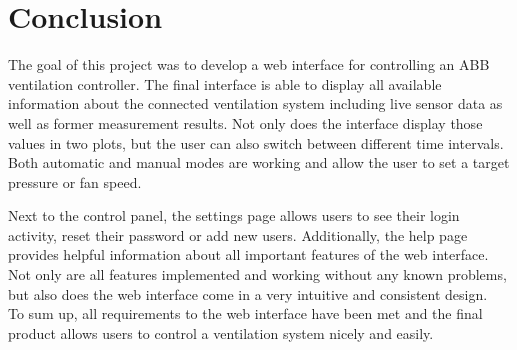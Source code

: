 
\chapter{Conclusion}
\label{ch:conclusion}

The goal of this project was to develop a web interface for controlling an ABB ventilation controller. The final interface is able to display all available information about the connected ventilation system including live sensor data as well as former measurement results. Not only does the interface display those values in two plots, but the user can also switch between different time intervals. Both automatic and manual modes are working and allow the user to set a target pressure or fan speed. 

Next to the control panel, the settings page allows users to see their login activity, reset their password or add new users. Additionally, the help page provides helpful information about all important features of the web interface. Not only are all features implemented and working without any known problems, but also does the web interface come in a very intuitive and consistent design.\\

To sum up, all requirements to the web interface have been met and the final product allows users to control a ventilation system nicely and easily. 



